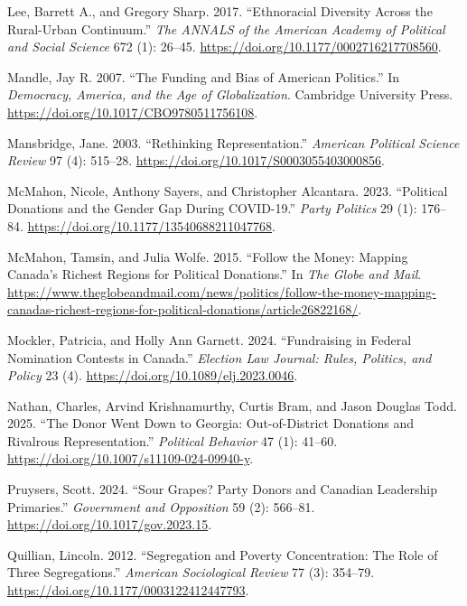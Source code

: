 \documentclass[
  letterpaper,
  DIV=11,
  numbers=noendperiod]{scrartcl}
\newlength{\cslhangindent}
\newenvironment{CSLReferences}[2] %
 {\begin{list}{}{%
  \setlength{\itemindent}{0pt}
  \setlength{\leftmargin}{0pt}
  \setlength{\parsep}{0pt}
  \ifodd #1
   \setlength{\leftmargin}{\cslhangindent}
   \setlength{\itemindent}{-1\cslhangindent}
  \fi
  \setlength{\itemsep}{#2\baselineskip}}}
 {\end{list}}
\begin{document}
\begin{CSLReferences}{1}{1}
Lee, Barrett A., and Gregory Sharp. 2017. {``Ethnoracial {Diversity}
Across the {Rural}-{Urban} {Continuum}.''} \emph{The ANNALS of the
American Academy of Political and Social Science} 672 (1): 26--45.
\url{https://doi.org/10.1177/0002716217708560}.

Mandle, Jay R. 2007. {``The Funding and Bias of American Politics.''} In
\emph{Democracy, America, and the Age of Globalization}. Cambridge
University Press. \url{https://doi.org/10.1017/CBO9780511756108}.

Mansbridge, Jane. 2003. {``Rethinking {Representation}.''}
\emph{American Political Science Review} 97 (4): 515--28.
\url{https://doi.org/10.1017/S0003055403000856}.

McMahon, Nicole, Anthony Sayers, and Christopher Alcantara. 2023.
{``Political Donations and the Gender Gap During {COVID}-19.''}
\emph{Party Politics} 29 (1): 176--84.
\url{https://doi.org/10.1177/13540688211047768}.

McMahon, Tamsin, and Julia Wolfe. 2015. {``Follow the Money: {Mapping}
{Canada}'s Richest Regions for Political Donations.''} In \emph{The
Globe and Mail}.
\url{https://www.theglobeandmail.com/news/politics/follow-the-money-mapping-canadas-richest-regions-for-political-donations/article26822168/}.

Mockler, Patricia, and Holly Ann Garnett. 2024. {``Fundraising in
Federal Nomination Contests in Canada.''} \emph{Election Law Journal:
Rules, Politics, and Policy} 23 (4).
\url{https://doi.org/10.1089/elj.2023.0046}.

Nathan, Charles, Arvind Krishnamurthy, Curtis Bram, and Jason Douglas
Todd. 2025. {``The {Donor} {Went} {Down} to {Georgia}:
{Out}-of-{District} {Donations} and {Rivalrous} {Representation}.''}
\emph{Political Behavior} 47 (1): 41--60.
\url{https://doi.org/10.1007/s11109-024-09940-y}.

Pruysers, Scott. 2024. {``Sour Grapes? Party Donors and Canadian
Leadership Primaries.''} \emph{Government and Opposition} 59 (2):
566--81. \url{https://doi.org/10.1017/gov.2023.15}.

Quillian, Lincoln. 2012. {``Segregation and {Poverty} {Concentration}:
{The} {Role} of {Three} {Segregations}.''} \emph{American Sociological
Review} 77 (3): 354--79. \url{https://doi.org/10.1177/0003122412447793}.


\end{CSLReferences}
\end{document}
